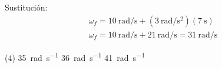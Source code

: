\documentclass[12pt, letter]{exam}
\begin{document}
\begin{questions}
    Sustitución:
    \begin{align*}
    \omega_{f} = \SI[per-mode=fraction]{10}{\radian\per\second} + \left( \SI[per-mode=fraction]{3}{\radian\per\square\second} \right) \left( \SI{7}{\second} \right) \\[0.5em]
    \omega_{f} = \SI[per-mode=fraction]{10}{\radian\per\second} + \SI[per-mode=fraction]{21}{\radian\per\second} = \SI[per-mode=fraction]{31}{\radian\per\second}
    \end{align*}
    \begin{tasks}(4)
        \task {}
        \task \SI{35}{\radian\per\second}
        \task \SI{36}{\radian\per\second}
        \task \SI{41}{\radian\per\second}
    \end{tasks}





\end{questions}
\end{document}

